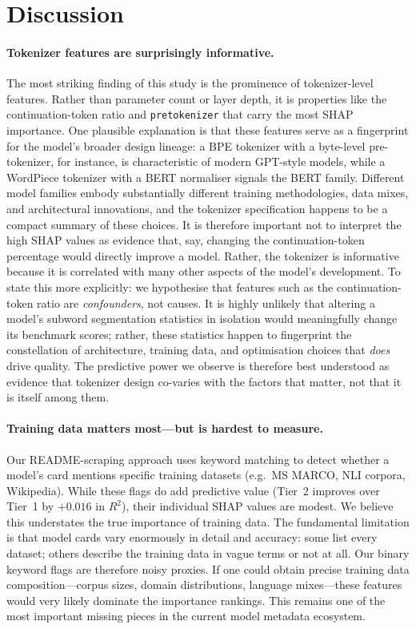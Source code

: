 \documentclass[11pt,a4paper,twocolumn]{article}
\begin{document}
\section{Discussion}
\label{sec:discussion}

\paragraph{Tokenizer features are surprisingly informative.}
The most striking finding of this study is the prominence of tokenizer-level features.
Rather than parameter count or layer depth, it is properties like the continuation-token ratio and \texttt{pretokenizer} that carry the most SHAP importance.
One plausible explanation is that these features serve as a fingerprint for the model's broader design lineage: a BPE tokenizer with a byte-level pre-tokenizer, for instance, is characteristic of modern GPT-style models, while a WordPiece tokenizer with a BERT normaliser signals the BERT family.
Different model families embody substantially different training methodologies, data mixes, and architectural innovations, and the tokenizer specification happens to be a compact summary of these choices.
It is therefore important not to interpret the high SHAP values as evidence that, say, changing the continuation-token percentage would directly improve a model.
Rather, the tokenizer is informative because it is correlated with many other aspects of the model's development.
To state this more explicitly: we hypothesise that features such as the continuation-token ratio are \emph{confounders}, not causes.
It is highly unlikely that altering a model's subword segmentation statistics in isolation would meaningfully change its benchmark scores; rather, these statistics happen to fingerprint the constellation of architecture, training data, and optimisation choices that \emph{does} drive quality.
The predictive power we observe is therefore best understood as evidence that tokenizer design co-varies with the factors that matter, not that it is itself among them.

\paragraph{Training data matters most---but is hardest to measure.}
Our README-scraping approach uses keyword matching to detect whether a model's card mentions specific training datasets (e.g.\ MS MARCO, NLI corpora, Wikipedia).
While these flags do add predictive value (Tier~2 improves over Tier~1 by $+0.016$ in $R^2$), their individual SHAP values are modest.
We believe this understates the true importance of training data.
The fundamental limitation is that model cards vary enormously in detail and accuracy: some list every dataset; others describe the training data in vague terms or not at all.
Our binary keyword flags are therefore noisy proxies.
If one could obtain precise training data composition---corpus sizes, domain distributions, language mixes---these features would very likely dominate the importance rankings.
This remains one of the most important missing pieces in the current model metadata ecosystem.
\end{document}

